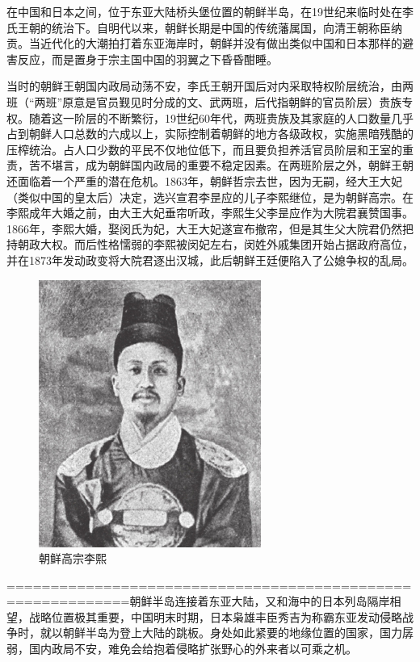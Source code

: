 \documentclass[12pt,UTF8]{ctexbook}
\begin{document}
在中国和日本之间，位于东亚大陆桥头堡位置的朝鲜半岛，在19世纪来临时处在李氏王朝的统治下。自明代以来，朝鲜长期是中国的传统藩属国，向清王朝称臣纳贡。当近代化的大潮拍打着东亚海岸时，朝鲜并没有做出类似中国和日本那样的避害反应，而是置身于宗主国中国的羽翼之下昏昏酣睡。

当时的朝鲜王朝国内政局动荡不安，李氏王朝开国后对内采取特权阶层统治，由两班（“两班”原意是官员觐见时分成的文、武两班，后代指朝鲜的官员阶层）贵族专权。随着这一阶层的不断繁衍，19世纪60年代，两班贵族及其家庭的人口数量几乎占到朝鲜人口总数的六成以上，实际控制着朝鲜的地方各级政权，实施黑暗残酷的压榨统治。占人口少数的平民不仅地位低下，而且要负担养活官员阶层和王室的重责，苦不堪言，成为朝鲜国内政局的重要不稳定因素。在两班阶层之外，朝鲜王朝还面临着一个严重的潜在危机。1863年，朝鲜哲宗去世，因为无嗣，经大王大妃（类似中国的皇太后）决定，选兴宣君李昰应的儿子李熙继位，是为朝鲜高宗。在李熙成年大婚之前，由大王大妃垂帘听政，李熙生父李昰应作为大院君襄赞国事。1866年，李熙大婚，娶闵氏为妃，大王大妃遂宣布撤帘，但是其生父大院君仍然把持朝政大权。而后性格懦弱的李熙被闵妃左右，闵姓外戚集团开始占据政府高位，并在1873年发动政变将大院君逐出汉城，此后朝鲜王廷便陷入了公媳争权的乱局。

\begin{figure}[htbp]
	\centering
	\includegraphics[width=0.7\linewidth]{3}
	\caption{朝鲜高宗李熙}
	\label{fig:1}
\end{figure}

============================================================朝鲜半岛连接着东亚大陆，又和海中的日本列岛隔岸相望，战略位置极其重要，中国明末时期，日本枭雄丰臣秀吉为称霸东亚发动侵略战争时，就以朝鲜半岛为登上大陆的跳板。身处如此紧要的地缘位置的国家，国力孱弱，国内政局不安，难免会给抱着侵略扩张野心的外来者以可乘之机。
\end{document}
